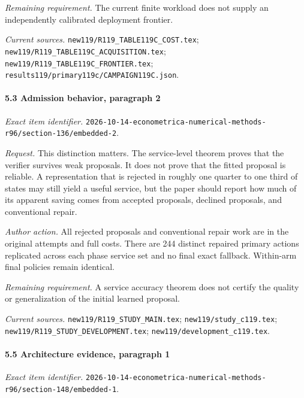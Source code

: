 \par\emph{Remaining requirement.} The current finite workload does not supply an independently calibrated deployment frontier.

\par\emph{Current sources.} \nolinkurl{new119/R119_TABLE119C_COST.tex}; \nolinkurl{new119/R119_TABLE119C_ACQUISITION.tex}; \nolinkurl{new119/R119_TABLE119C_FRONTIER.tex}; \nolinkurl{results119/primary119c/CAMPAIGN119C.json}.

\paragraph{5.3 Admission behavior, paragraph 2}

\emph{Exact item identifier.} \nolinkurl{2026-10-14-econometrica-numerical-methods-r96/section-136/embedded-2}.

\par\emph{Request.} This distinction matters. The service-level theorem proves that the verifier survives weak proposals. It does not prove that the fitted proposal is reliable. A representation that is rejected in roughly one quarter to one third of states may still yield a useful service, but the paper should report how much of its apparent saving comes from accepted proposals, declined proposals, and conventional repair.

\par\emph{Author action.} All rejected proposals and conventional repair work are in the original attempts and full costs. There are 244 distinct repaired primary actions replicated across each phase service set and no final exact fallback. Within-arm final policies remain identical.

\par\emph{Remaining requirement.} A service accuracy theorem does not certify the quality or generalization of the initial learned proposal.

\par\emph{Current sources.} \nolinkurl{new119/R119_STUDY_MAIN.tex}; \nolinkurl{new119/study_c119.tex}; \nolinkurl{new119/R119_STUDY_DEVELOPMENT.tex}; \nolinkurl{new119/development_c119.tex}.

\paragraph{5.5 Architecture evidence, paragraph 1}

\emph{Exact item identifier.} \nolinkurl{2026-10-14-econometrica-numerical-methods-r96/section-148/embedded-1}.

